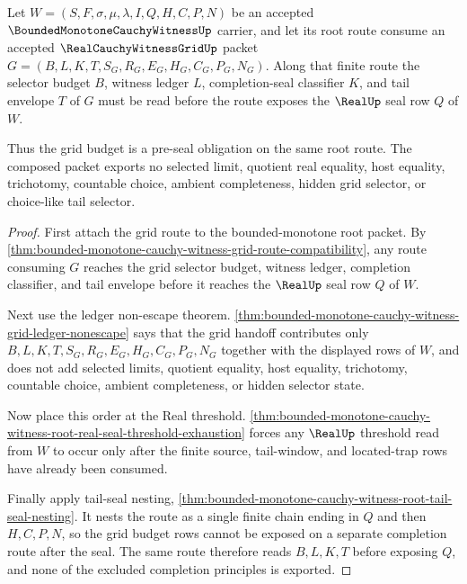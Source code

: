 \begin{theorem}
\label{thm:bounded-monotone-cauchy-witness-grid-budget-precedes-seal}
Let $W=(S,F,\sigma,\mu,\lambda,I,Q,H,C,P,N)$ be an accepted $\BoundedMonotoneCauchyWitnessUp$ carrier, and let its root route consume an accepted $\RealCauchyWitnessGridUp$ packet $G=(B,L,K,T,S_G,R_G,E_G,H_G,C_G,P_G,N_G)$. Along that finite route the selector budget $B$, witness ledger $L$, completion-seal classifier $K$, and tail envelope $T$ of $G$ must be read before the route exposes the $\RealUp$ seal row $Q$ of $W$.

Thus the grid budget is a pre-seal obligation on the same root route. The composed packet exports no selected limit, quotient real equality, host equality, trichotomy, countable choice, ambient completeness, hidden grid selector, or choice-like tail selector.
\end{theorem}
\begin{proof}
First attach the grid route to the bounded-monotone root packet. By \autoref{thm:bounded-monotone-cauchy-witness-grid-route-compatibility}, any route consuming $G$ reaches the grid selector budget, witness ledger, completion classifier, and tail envelope before it reaches the $\RealUp$ seal row $Q$ of $W$.

Next use the ledger non-escape theorem. \autoref{thm:bounded-monotone-cauchy-witness-grid-ledger-nonescape} says that the grid handoff contributes only $B,L,K,T,S_G,R_G,E_G,H_G,C_G,P_G,N_G$ together with the displayed rows of $W$, and does not add selected limits, quotient equality, host equality, trichotomy, countable choice, ambient completeness, or hidden selector state.

Now place this order at the Real threshold. \autoref{thm:bounded-monotone-cauchy-witness-root-real-seal-threshold-exhaustion} forces any $\RealUp$ threshold read from $W$ to occur only after the finite source, tail-window, and located-trap rows have already been consumed.

Finally apply tail-seal nesting, \autoref{thm:bounded-monotone-cauchy-witness-root-tail-seal-nesting}. It nests the route as a single finite chain ending in $Q$ and then $H,C,P,N$, so the grid budget rows cannot be exposed on a separate completion route after the seal. The same route therefore reads $B,L,K,T$ before exposing $Q$, and none of the excluded completion principles is exported.
\end{proof}

